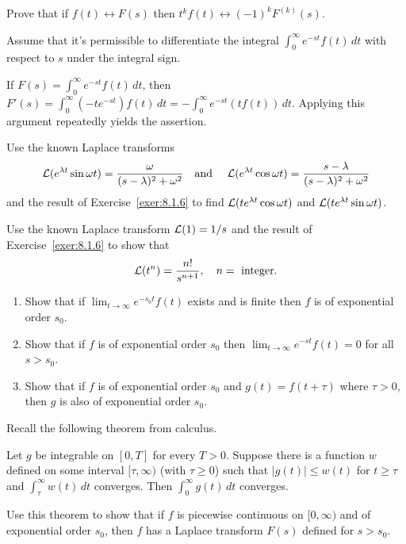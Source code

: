 \documentclass{ximera}
\begin{document}
\begin{problem}\label{exer:8.1.6}
Prove that if $f(t)\leftrightarrow F(s)$ then $t^kf(t)\leftrightarrow
(-1)^kF^{(k)}(s)$.

\begin{hint}
    Assume that it's permissible to differentiate
the integral $\int_0^\infty e^{-st}f(t)\,dt$ with respect to $s$ under
the integral sign.
\end{hint}

\begin{solution}
If $F(s)=\int_0^\infty e^{-st}f(t)\,dt$, then
$F'(s)=\int_0^\infty(-te^{-st})f(t)\,dt=-\int_0^\infty
e^{-st}(tf(t))\,dt$. Applying this argument repeatedly yields
the assertion.
\end{solution}
\end{problem}

\begin{problem}\label{exer:8.1.7}
Use the known Laplace transforms
$$
{\cal L}(e^{\lambda t}\sin\omega t)=\frac{\omega}{(s-\lambda)^2+\omega^2}
\quad\text{and }\quad
{\cal L}(e^{\lambda t}\cos\omega t)=\frac{s-\lambda}{(s-\lambda)^2+\omega^2}
$$
  and the result of Exercise~\ref{exer:8.1.6} to find
${\cal L}(te^{\lambda t}\cos\omega t)$ and
${\cal L}(te^{\lambda t}\sin\omega t)$.
\end{problem}

\begin{problem}\label{exer:8.1.8}
 Use the known Laplace transform ${\cal L}(1)=1/s$ and the result of
Exercise~\ref{exer:8.1.6} to show that
$$
{\cal L}(t^n)=\frac{n!}{s^{n+1}},\quad n=\text{ integer}.
$$
\end{problem}

\begin{problem}\label{exer:8.1.9}
\begin{enumerate}
\item %
 Show that if $\lim_{t\to\infty} e^{-s_0t} f(t)$ exists and
is finite then  $f$ is of exponential order $s_0$.
\item %
 Show that if $f$ is of exponential order $s_0$ then $\lim_{t
\to\infty} e^{-st} f(t)=0$ for all $s>s_0$.
\item %
Show that if $f$ is of exponential order $s_0$  and $g(t)=f(t+\tau)$
where $\tau>0$, then $g$ is also of exponential order $s_0$.
\end{enumerate}
\end{problem}

\begin{problem}\label{exer:8.1.10}
Recall the following theorem from calculus.

\begin{theorem}
    Let $g$ be integrable on $[0,T]$ for
every $T>0.$  Suppose there is a function $w$ defined on some
interval $[\tau,\infty)$ (with $\tau\ge 0$) such that $|g(t)|\le
w(t)$ for $t\ge\tau$ and $\int^\infty_\tau w(t)\,dt$
converges.  Then $\int_0^\infty g(t)\,dt$ converges.
\end{theorem} 

Use this theorem to show that if $f$ is piecewise continuous on
$[0,\infty)$ and of exponential order $s_0$, then $f$ has a Laplace
transform $F(s)$ defined for $s>s_0$.
\end{problem}
\end{document}
